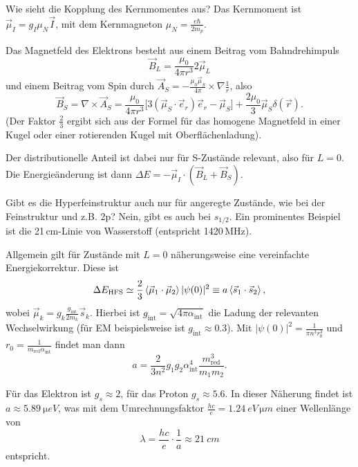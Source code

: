 \begin{fquestion}{Wie sieht die Kopplung des Kernmomentes aus?}
    Das Kernmoment ist $\Vec{\mu}_I = g_I\mu_N \Vec{I}$, mit dem Kernmagneton $\mu_N = \frac{e\hbar}{2m_p}$.
    
    Das Magnetfeld des Elektrons besteht aus einem Beitrag vom Bahndrehimpuls
    $$\Vec{B}_L = \frac{\mu_0}{4\pi r^3} 2\Vec{\mu}_L$$
    und einem Beitrag vom Spin durch $\Vec{A}_S = -\frac{\mu_0\Vec{\mu}_S}{4\pi} \times \nabla\frac{1}{r}$, also
    $$\Vec{B}_S = \nabla\times\Vec{A}_S = \frac{\mu_0}{4\pi r^3} \big[ 3(\Vec{\mu}_S\cdot \Vec{e}_r)\Vec{e}_r - \Vec{\mu}_S \big] + \frac{2\mu_0}{3}\Vec{\mu}_S\delta (\Vec{r}).$$
    (Der Faktor $\frac{2}{3}$ ergibt sich aus der Formel für das homogene Magnetfeld in einer Kugel oder einer rotierenden Kugel mit Oberflächenladung).
    
    Der distributionelle Anteil ist dabei nur für S-Zustände relevant, also für $L=0$.
    Die Energieänderung ist dann $\Delta E = -\Vec{\mu}_I \cdot (\Vec{B}_L + \Vec{B}_S)$.
\end{fquestion}

\begin{fquestion}{Gibt es die Hyperfeinstruktur auch nur für angeregte Zustände, wie bei der Feinstruktur und z.B. 2p?}
    Nein, gibt es auch bei $s_{1/2}$.
    Ein prominentes Beispiel ist die 21\,cm-Linie von Wasserstoff (entspricht 1420\,MHz).
    
    Allgemein gilt für Zustände mit $L=0$ näherungsweise eine vereinfachte Energiekorrektur.
    Diese ist
    $$\Delta E_\mathrm{HFS} \simeq \frac{2}{3} \expval{\Vec{\mu}_1\cdot\Vec{\mu}_2} |\psi (0)|^2 \equiv a \expval{\Vec{s}_1\cdot\Vec{s}_2},$$
    wobei $\Vec{\mu}_k = g_k \frac{g_\mathrm{int}}{2m_k} \Vec{s}_k$.
    Hierbei ist $g_\mathrm{int} = \sqrt{4\pi \alpha_\mathrm{int}}$ die Ladung der relevanten Wechselwirkung (für EM beispielsweise ist $g_\mathrm{int} \approx 0.3$).
    Mit $|\psi(0)|^2 = \frac{1}{\pi n^3r_0^3}$ und $r_0 = \frac{1}{m_\mathrm{red} \alpha_\mathrm{int}}$ findet man dann
    $$a = \frac{2}{3n^2} g_1g_2 \alpha_\mathrm{int}^4 \frac{m_\mathrm{red}^3}{m_1m_2}.$$
    
    Für das Elektron ist $g_s\approx 2$, für das Proton $g_s \approx 5.6$.
    In dieser Näherung findet ist $a \approx \SI{5.89}{\micro eV}$, was mit dem Umrechnungsfaktor $\frac{hc}{e} = \SI{1.24}{eV\,\micro m}$ einer Wellenlänge von
    $$\lambda = \frac{hc}{e}\cdot\frac{1}{a} \approx \SI{21}{cm}$$
    entspricht.
\end{fquestion}


